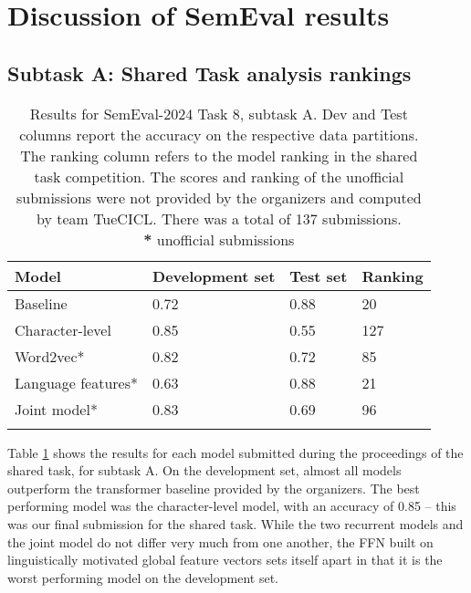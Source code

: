 \section{Discussion of SemEval results}
\label{sec:discussion}

\subsection{Subtask A: Shared Task analysis rankings}

\begin{table}[ht]
    \centering
    \begin{tabular}{llll}
        \toprule
        \textbf{Model}     & \textbf{Development set} & \textbf{Test set} & \textbf{Ranking} \\
        \midrule
        Baseline           & 0.72                     & 0.88              & 20               \\
        \midrule
        Character-level    & 0.85                     & 0.55              & 127              \\
        Word2vec*          & 0.82                     & 0.72              & 85               \\
        Language features* & 0.63                     & 0.88              & 21               \\
        Joint model*       & 0.83                     & 0.69              & 96               \\
        \bottomrule
        \vspace{0.1cm}
    \end{tabular}
    \caption{Results for SemEval-2024 Task 8, subtask A. Dev and Test columns report the accuracy on the respective data partitions. The ranking column refers to the model ranking in the shared task competition. The scores and ranking of the unofficial submissions were not provided by the organizers and computed by team TueCICL. There was a total of 137 submissions.\\ \textbf{*} unofficial submissions}
    \label{tab:a_results}
\end{table}

Table \ref{tab:a_results} shows the results for each model submitted during the proceedings of the shared task, for subtask A.
On the development set, almost all models outperform the transformer baseline provided by the organizers.
The best performing model was the character-level model, with an accuracy of 0.85 -- this was our final submission for the shared task.
While the two recurrent models and the joint model do not differ very much from one another, the FFN built on linguistically motivated global feature vectors sets itself apart in that it is the worst performing model on the development set.

